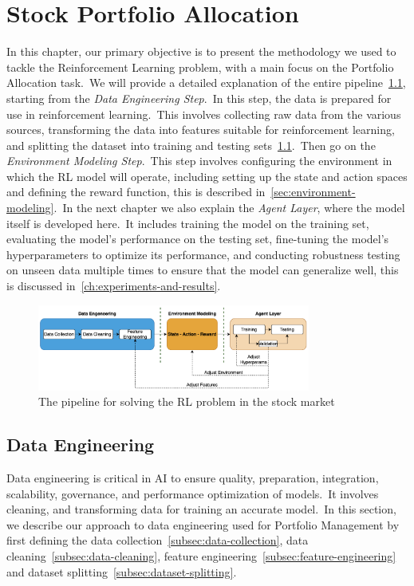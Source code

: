 \documentclass[../xlapes02]{subfiles}
\begin{document}
    \chapter{Stock Portfolio Allocation}\label{ch:stock-portfolio-allocation}
    In this chapter, our primary objective is to present the methodology we used to tackle the Reinforcement Learning problem, with a main focus on the Portfolio Allocation task.\ We will provide a detailed explanation of the entire pipeline~\cref{fig:pipeline}, starting from the \emph{Data Engineering Step}.\ In this step, the data is prepared for use in reinforcement learning.\ This involves collecting raw data from the various sources, transforming the data into features suitable for reinforcement learning, and splitting the dataset into training and testing sets~\cref{sec:data-engineering}.\ Then go on the \emph{Environment Modeling Step}.\ This step involves configuring the environment in which the RL model will operate, including setting up the state and action spaces and defining the reward function, this is described in~\cref{sec:environment-modeling}.\ In the next chapter we also explain the \emph{Agent Layer}, where the model itself is developed here.\ It includes training the model on the training set, evaluating the model's performance on the testing set, fine-tuning the model's hyperparameters to optimize its performance, and conducting robustness testing on unseen data multiple times to ensure that the model can generalize well, this is discussed in~\cref{ch:experiments-and-results}.

    \begin{figure}[ht!]
        \centering
        \includegraphics[width=0.8\textwidth]{./image/pipeline}
        \caption{The pipeline for solving the RL problem in the stock market~\cite{liu2022finrlmeta}}
        \label{fig:pipeline}
    \end{figure}


    \section{Data Engineering}\label{sec:data-engineering}
    Data engineering is critical in AI to ensure quality, preparation, integration, scalability, governance, and performance optimization of models.\ It involves cleaning, and transforming data for training an accurate model.\ In this section, we describe our approach to data engineering used for Portfolio Management by first defining the data collection~\cref{subsec:data-collection}, data cleaning~\cref{subsec:data-cleaning}, feature engineering~\cref{subsec:feature-engineering} and dataset splitting~\cref{subsec:dataset-splitting}.
\end{document}
